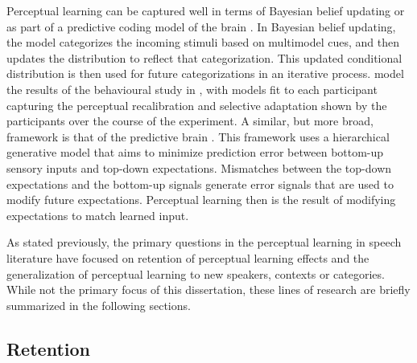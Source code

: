 Perceptual learning can be captured well in terms of Bayesian belief updating \citep{Kleinschmidt2011} or as part of a predictive coding model of the brain \citep{Clark2013}.  
In Bayesian belief updating, the model categorizes the incoming stimuli based on multimodel cues, and then updates the distribution to reflect that categorization.  
This updated conditional distribution is then used for future categorizations in an iterative process.  
\citet{Kleinschmidt2011} model the results of the behavioural study in \citet{Vroomen2007}, with models fit to each participant capturing the perceptual recalibration and selective adaptation shown by the participants over the course of the experiment.  
A similar, but more broad, framework is that of the predictive brain \citep{Clark2013}. 
This framework uses a hierarchical generative model that aims to minimize prediction error between bottom-up sensory inputs and top-down expectations.  
Mismatches between the top-down expectations and the bottom-up signals generate error signals that are used to modify future expectations.  
Perceptual learning then is the result of modifying expectations to match learned input.

As stated previously, the primary questions in the perceptual learning in speech literature have focused on retention of perceptual learning effects and the generalization of perceptual learning to new speakers, contexts or categories.  
While not the primary focus of this dissertation, these lines of research are briefly summarized in the following sections.

\subsection{Retention}
\label{sec:retention}

